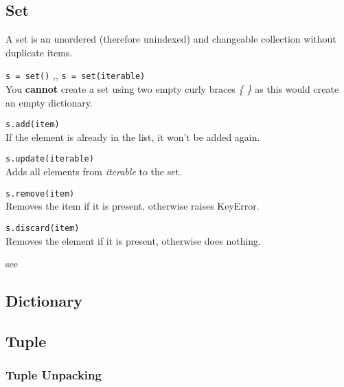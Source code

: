   \subsection{Set}
    A set is an unordered (therefore unindexed) and  changeable collection without duplicate items.

    \begin{itemize}
       \texttt{s = set()} \sep{,}
      \texttt{s = set(iterable)} \\
      You \textbf{cannot} create a set using two empty curly braces \textit{\{ \}} as this would
      create an empty dictionary.

       \texttt{s.add(item)} \\
      If the element is already in the list, it won't be added again.

       \texttt{s.update(iterable)} \\
      Adds all elements from \textit{iterable} to the set.

       \texttt{s.remove(item)} \\
      Removes the item if it is present, otherwise raises KeyError.

       \texttt{s.discard(item)} \\
      Removes the element if it is present, otherwise does nothing.

       see 
    \end{itemize}

  \subsection{Dictionary}

  \subsection{Tuple}

    \subsubsection{Tuple Unpacking}
    